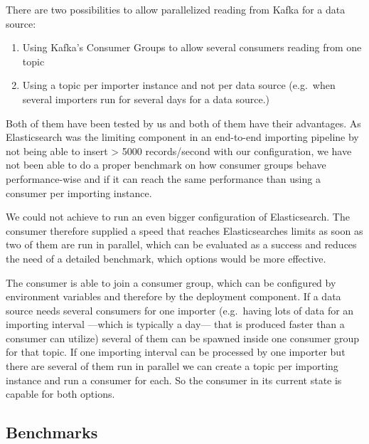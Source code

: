 There are two possibilities to allow parallelized reading from Kafka for
a data source:

\begin{enumerate}
\def\labelenumi{\arabic{enumi}.}
\tightlist
\item
  Using Kafka's Consumer Groups to allow several consumers reading from
  one topic
\item
  Using a topic per importer instance and not per data source (e.g.~when
  several importers run for several days for a data source.)
\end{enumerate}

Both of them have been tested by us and both of them have their
advantages. As Elasticsearch was the limiting component in an end-to-end
importing pipeline by not being able to insert \textgreater{} 5000
records/second with our configuration, we have not been able to do a
proper benchmark on how consumer groups behave performance-wise and if
it can reach the same performance than using a consumer per importing
instance.

We could not achieve to run an even bigger configuration of
Elasticsearch. The consumer therefore supplied a speed that reaches
Elasticsearches limits as soon as two of them are run in parallel, which
can be evaluated as a success and reduces the need of a detailed
benchmark, which options would be more effective.

The consumer is able to join a consumer group, which can be configured
by environment variables and therefore by the deployment component. If a
data source needs several consumers for one importer (e.g.~having lots
of data for an importing interval ---which is typically a day--- that is
produced faster than a consumer can utilize) several of them can be
spawned inside one consumer group for that topic. If one importing
interval can be processed by one importer but there are several of them
run in parallel we can create a topic per importing instance and run a
consumer for each. So the consumer in its current state is capable for
both options.

\subsection{Benchmarks}\label{benchmarks}
